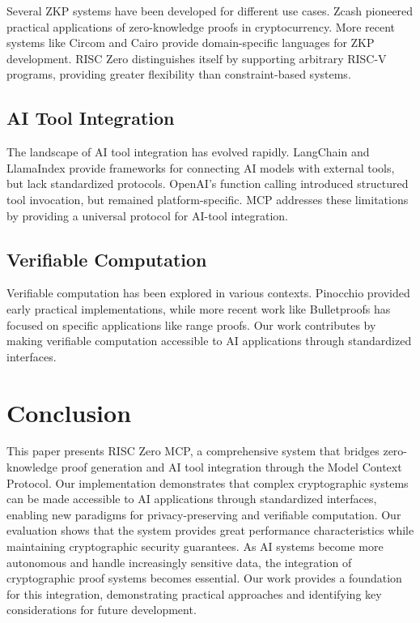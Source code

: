 \documentclass[11pt]{article}
\begin{document}
Several ZKP systems have been developed for different use cases. Zcash pioneered practical applications of zero-knowledge proofs in cryptocurrency. More recent systems like Circom and Cairo provide domain-specific languages for ZKP development. RISC Zero distinguishes itself by supporting arbitrary RISC-V programs, providing greater flexibility than constraint-based systems.

\subsection{AI Tool Integration}

The landscape of AI tool integration has evolved rapidly. LangChain and LlamaIndex provide frameworks for connecting AI models with external tools, but lack standardized protocols. OpenAI's function calling introduced structured tool invocation, but remained platform-specific. MCP addresses these limitations by providing a universal protocol for AI-tool integration.

\subsection{Verifiable Computation}

Verifiable computation has been explored in various contexts. Pinocchio provided early practical implementations, while more recent work like Bulletproofs has focused on specific applications like range proofs. Our work contributes by making verifiable computation accessible to AI applications through standardized interfaces.


\section{Conclusion}
\label{sec:conclusion}

This paper presents RISC Zero MCP, a comprehensive system that bridges zero-knowledge proof generation and AI tool integration through the Model Context Protocol. Our implementation demonstrates that complex cryptographic systems can be made accessible to AI applications through standardized interfaces, enabling new paradigms for privacy-preserving and verifiable computation. Our evaluation shows that the system provides great performance characteristics while maintaining cryptographic security guarantees. As AI systems become more autonomous and handle increasingly sensitive data, the integration of cryptographic proof systems becomes essential. Our work provides a foundation for this integration, demonstrating practical approaches and identifying key considerations for future development.
\end{document}
